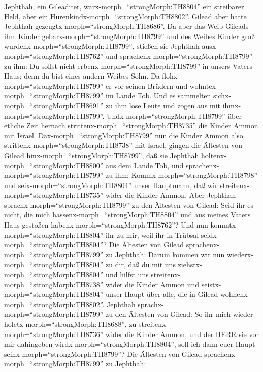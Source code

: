  Jephthah, ein Gileaditer, warx-morph=``strongMorph:TH8804''
ein streibarer Held, aber ein Hurenkindx-morph=``strongMorph:TH8802''.
Gilead aber hatte Jephthah gezeugtx-morph=``strongMorph:TH8686''.
 Da aber das Weib Gileads ihm Kinder
gebarx-morph=``strongMorph:TH8799'' und des Weibes Kinder groß
wurdenx-morph=``strongMorph:TH8799'', stießen sie Jephthah
ausx-morph=``strongMorph:TH8762'' und
sprachenx-morph=``strongMorph:TH8799'' zu ihm: Du sollst nicht
erbenx-morph=``strongMorph:TH8799'' in unsers Vaters Haus; denn du bist
eines andern Weibes Sohn.  Da
flohx-morph=``strongMorph:TH8799'' er vor seinen Brüdern und
wohntex-morph=``strongMorph:TH8799'' im Lande Tob. Und es sammelten
sichx-morph=``strongMorph:TH8691'' zu ihm lose Leute und zogen aus mit
ihmx-morph=``strongMorph:TH8799''. 
Undx-morph=``strongMorph:TH8799'' über etliche Zeit hernach
strittenx-morph=``strongMorph:TH8735'' die Kinder Ammon mit Israel.
 Dax-morph=``strongMorph:TH8799'' nun die Kinder Ammon also
strittenx-morph=``strongMorph:TH8738'' mit Israel, gingen die Ältesten
von Gilead hinx-morph=``strongMorph:TH8799'', daß sie Jephthah
holtenx-morph=``strongMorph:TH8800'' aus dem Lande Tob,  und
sprachenx-morph=``strongMorph:TH8799'' zu ihm:
Kommx-morph=``strongMorph:TH8798'' und seix-morph=``strongMorph:TH8804''
unser Hauptmann, daß wir streitenx-morph=``strongMorph:TH8735'' wider
die Kinder Ammon.  Aber Jephthah
sprachx-morph=``strongMorph:TH8799'' zu den Ältesten von Gilead: Seid
ihr es nicht, die mich hassenx-morph=``strongMorph:TH8804'' und aus
meines Vaters Haus gestoßen habenx-morph=``strongMorph:TH8762''? Und nun
kommtx-morph=``strongMorph:TH8804'' ihr zu mir, weil ihr in Trübsal
seidx-morph=``strongMorph:TH8804''?  Die Ältesten von Gilead
sprachenx-morph=``strongMorph:TH8799'' zu Jephthah: Darum kommen wir nun
wiederx-morph=``strongMorph:TH8804'' zu dir, daß du mit uns
ziehstx-morph=``strongMorph:TH8804'' und hilfst uns
streitenx-morph=``strongMorph:TH8738'' wider die Kinder Ammon und
seistx-morph=``strongMorph:TH8804'' unser Haupt über alle, die in Gilead
wohnenx-morph=``strongMorph:TH8802''.  Jephthah
sprachx-morph=``strongMorph:TH8799'' zu den Ältesten von Gilead: So ihr
mich wieder holetx-morph=``strongMorph:TH8688'', zu
streitenx-morph=``strongMorph:TH8736'' wider die Kinder Ammon, und der
HERR sie vor mir dahingeben wirdx-morph=``strongMorph:TH8804'', soll ich
dann euer Haupt seinx-morph=``strongMorph:TH8799''?  Die
Ältesten von Gilead sprachenx-morph=``strongMorph:TH8799'' zu Jephthah:
